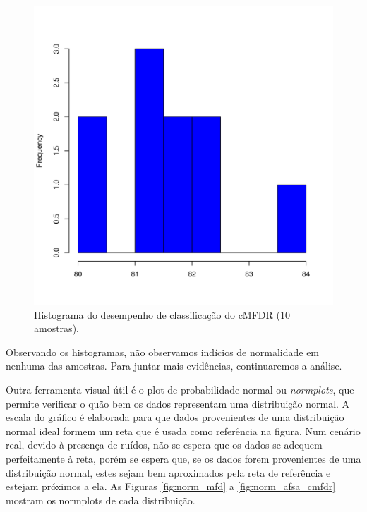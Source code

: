 \documentclass[conference]{IEEEtran}
\begin{document}
\begin{figure}[h]
	\centering
	\includegraphics[width=\linewidth]{img/bluehist_afsa_cmfdr.pdf}
	\caption{Histograma do desempenho de classificação do cMFDR (10 amostras).}
	\label{fig:hist_afsa_cmfdr}
\end{figure}

Observando os histogramas, não observamos indícios de normalidade em nenhuma das amostras.
Para juntar mais evidências, continuaremos a análise.

Outra ferramenta visual útil é o plot de probabilidade normal ou \textit{normplots}, que permite verificar o quão bem os dados representam uma distribuição normal.
A escala do gráfico é elaborada para que dados provenientes de uma distribuição normal ideal formem um reta que é usada como referência na figura.
Num cenário real, devido à presença de ruídos, não se espera que os dados se adequem perfeitamente à reta, porém se espera que, se os dados forem provenientes de uma distribuição normal, estes sejam bem aproximados pela reta de referência e estejam próximos a ela.
As Figuras \ref{fig:norm_mfd} a \ref{fig:norm_afsa_cmfdr} mostram os normplots de cada distribuição.
\end{document}
